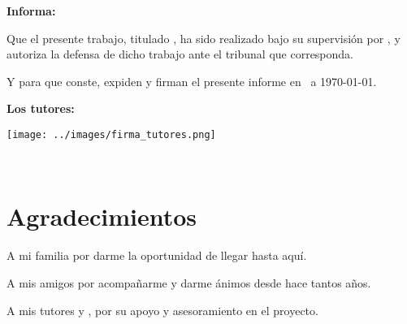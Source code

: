 \textbf{Informa:}

\vspace{0.5cm}

Que el presente trabajo, titulado \textit{\textbf{\titulo}}, ha sido realizado bajo su supervisión por \textbf{\autor}, y 
autoriza la defensa de dicho trabajo ante el tribunal que corresponda.

\vspace{0.5cm}

Y para que conste, expiden y firman el presente informe en \ciudad\ a \today.

\vspace{1cm}

\textbf{Los tutores:}

\vspace{0.5cm}
\texttt{[image: ../images/firma\_tutores.png]}
\vspace{3cm}

\noindent \textbf{\tutor}\\[0.5cm]
\noindent \textbf{\cotutor}

\chapter*{Agradecimientos}
\thispagestyle{empty}

\vspace{1cm}

\bigskip
A mi familia por darme la oportunidad de llegar hasta aquí.

\bigskip
A mis amigos por acompañarme y darme ánimos desde hace tantos años.

\bigskip
A mis tutores {\tutor} y {\cotutor}, por su apoyo y asesoramiento en el proyecto.
